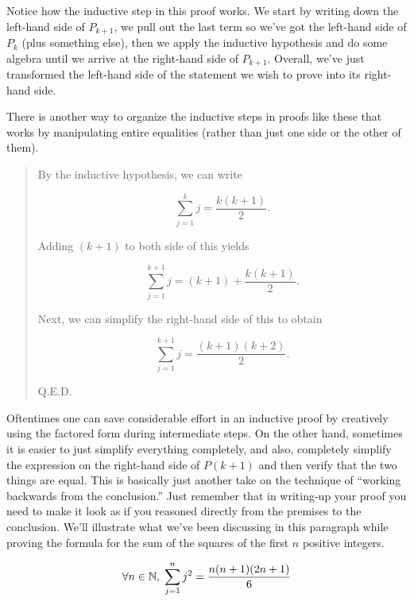 Notice how the inductive step in this proof works.  We start by writing
down the left-hand side of $P_{k+1}$, we pull out the last term
so we've got the left-hand side of $P_{k}$ (plus something else), then
we apply the inductive hypothesis and do some algebra until we arrive
at the right-hand side of $P_{k+1}$.  Overall, we've just transformed the
left-hand side of the statement we wish to prove into its right-hand side.

There is another way to organize the inductive steps in proofs like these
that works by manipulating entire equalities (rather than just one side
or the other of them).

\begin{quote}

  By the inductive 
hypothesis, we can write

\[ \sum_{j=1}^{k} j = \frac{k(k+1)}{2}. \]

Adding $(k+1)$ to both side of this yields

\[ \sum_{j=1}^{k+1} j = (k+1) + \frac{k(k+1)}{2}. \]

Next, we can simplify the right-hand side of this to obtain

\[ \sum_{j=1}^{k+1} j = \frac{(k+1)(k+2)}{2}. \]

\rule{0pt}{0pt} \hspace{\fill} Q.E.D.
\end{quote}
\medskip

Oftentimes one can save considerable effort in an inductive 
proof by creatively using the factored form during intermediate steps.
On the other hand, sometimes it is easier to just simplify everything
completely, and also, completely simplify the expression on the 
right-hand side of $P(k+1)$ and then verify that the two things are
equal.  This is basically just another take on the technique of 
``working backwards from the conclusion.''  Just remember that 
in writing-up your proof you need to make it look as if you reasoned
directly from the premises to the conclusion.  We'll illustrate
what we've been discussing in this paragraph while proving
the formula for the sum of the squares of the first $n$ positive integers.

\begin{thm}
\[ \forall n \in {\mathbb N}, \; \sum_{j=1}^n j^2 = \frac{n(n+1)(2n+1)}{6} \]
\end{thm}

